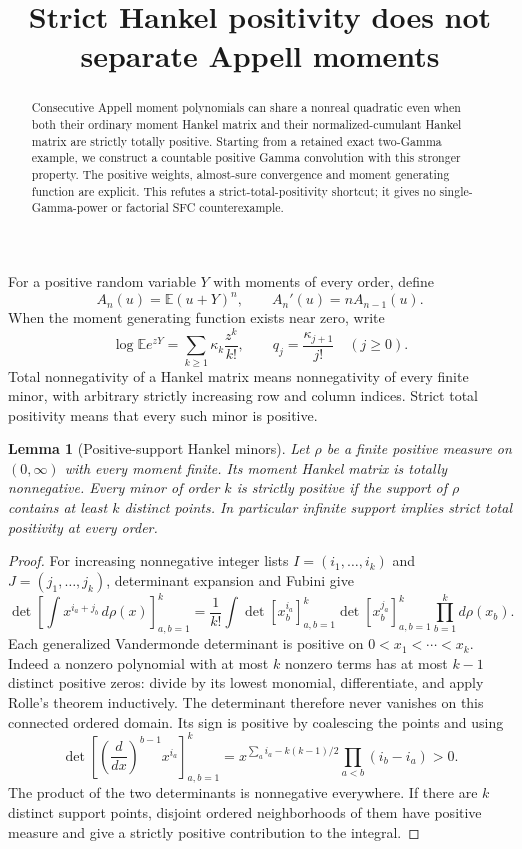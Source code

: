 \documentclass[11pt]{article}
\newtheorem{lemma}[theorem]{Lemma}
\newcommand{\E}{\mathbb E}
\begin{document}
\setlength{\emergencystretch}{1em}
\title{Strict Hankel positivity does not separate Appell moments}
\author{}\date{}\maketitle
\begin{abstract}
Consecutive Appell moment polynomials can share a nonreal quadratic
even when both their ordinary moment Hankel matrix and their
normalized-cumulant Hankel matrix are strictly totally positive.
Starting from a retained exact two-Gamma example, we construct a
countable positive Gamma convolution with this stronger property.
The positive weights, almost-sure convergence and moment generating
function are explicit. This refutes a strict-total-positivity
shortcut; it gives no single-Gamma-power or factorial SFC
counterexample.
\end{abstract}

For a positive random variable $Y$ with moments of every order, define
\[
 A_n(u)=\E(u+Y)^n,\qquad A_n'(u)=nA_{n-1}(u).
\]
When the moment generating function exists near zero, write
\[
 \log \E e^{zY}=\sum_{k\ge1}\kappa_k\frac{z^k}{k!},
 \qquad q_j=\frac{\kappa_{j+1}}{j!}\quad(j\ge0).
\]
Total nonnegativity of a Hankel matrix means nonnegativity of every
finite minor, with arbitrary strictly increasing row and column
indices. Strict total positivity means that every such minor is
positive.

\begin{lemma}[Positive-support Hankel minors]\label{lem:hankel}
Let $\rho$ be a finite positive measure on $(0,\infty)$ with every
moment finite. Its moment Hankel matrix is totally nonnegative.
Every minor of order $k$ is strictly positive if the support of
$\rho$ contains at least $k$ distinct points. In particular infinite
support implies strict total positivity at every order.
\end{lemma}
\begin{proof}
For increasing nonnegative integer lists $I=(i_1,\ldots,i_k)$ and
$J=(j_1,\ldots,j_k)$, determinant expansion and Fubini give
\[
 \det\left[\int x^{i_a+j_b}\,d\rho(x)\right]_{a,b=1}^k
 =\frac1{k!}\int
       \det[x_b^{i_a}]_{a,b=1}^k
       \det[x_b^{j_a}]_{a,b=1}^k\prod_{b=1}^k d\rho(x_b).
\]
Each generalized Vandermonde determinant is positive on
$0<x_1<\cdots<x_k$. Indeed a nonzero polynomial with at most $k$
nonzero terms has at most $k-1$ distinct positive zeros: divide by its
lowest monomial, differentiate, and apply Rolle's theorem inductively.
The determinant therefore never vanishes on this connected ordered
domain. Its sign is positive by coalescing the points and using
\[
 \det\left[
  \left(\frac{d}{dx}\right)^{b-1}x^{i_a}
 \right]_{a,b=1}^k
 =x^{\sum_a i_a-k(k-1)/2}
       \prod_{a<b}(i_b-i_a)>0.
\]
The product of the two determinants is nonnegative everywhere.
If there are $k$ distinct support points, disjoint ordered
neighborhoods of them have positive measure and give a strictly
positive contribution to the integral.
\end{proof}
\end{document}
